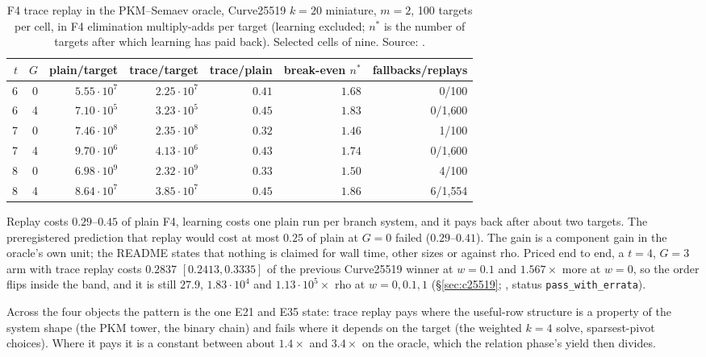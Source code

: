 \begin{table}[t]
\centering\small
\begin{tabular}{@{}rrrrrrr@{}}
\toprule
$t$ & $G$ & plain/target & trace/target & trace/plain & break-even $n^*$ & fallbacks/replays \\
\midrule
6 & 0 & $5.55\cdot10^7$ & $2.25\cdot10^7$ & $0.41$ & $1.68$ & 0/100 \\
6 & 4 & $7.10\cdot10^5$ & $3.23\cdot10^5$ & $0.45$ & $1.83$ & 0/1{,}600 \\
7 & 0 & $7.46\cdot10^8$ & $2.35\cdot10^8$ & $0.32$ & $1.46$ & 1/100 \\
7 & 4 & $9.70\cdot10^6$ & $4.13\cdot10^6$ & $0.43$ & $1.74$ & 0/1{,}600 \\
8 & 0 & $6.98\cdot10^9$ & $2.32\cdot10^9$ & $0.33$ & $1.50$ & 4/100 \\
8 & 4 & $8.64\cdot10^7$ & $3.85\cdot10^7$ & $0.45$ & $1.86$ & 6/1{,}554 \\
\bottomrule
\end{tabular}
\caption[]{F4 trace replay in the PKM--Semaev oracle, Curve25519 $k=20$
miniature, $m=2$, 100 targets per cell, in F4 elimination multiply-adds per
target (learning excluded; $n^*$ is the number of targets after which
learning has paid back). Selected cells of nine. Source:
.}
\label{tab:fe-trace}
\end{table}

\noindent Replay costs $0.29$--$0.45$ of plain F4, learning costs one plain
run per branch system, and it pays back after about two targets. The
preregistered prediction that replay would cost at most $0.25$ of plain at
$G=0$ failed ($0.29$--$0.41$). The gain is a component gain in the oracle's
own unit; the README states that nothing is claimed for wall time, other
sizes or against rho. Priced end to end, a $t=4$, $G=3$ arm with trace
replay costs $0.2837$ $[0.2413,0.3335]$ of the previous Curve25519 winner at
$w=0.1$ and $1.567\times$ more at $w=0$, so the order flips inside the band,
and it is still $27.9$, $1.83\cdot10^4$ and $1.13\cdot10^5\times$ rho at
$w=0,0.1,1$ (\S\ref{sec:c25519};
,
status \texttt{pass\_with\_errata}).

Across the four objects the pattern is the one E21 and E35 state: trace
replay pays where the useful-row structure is a property of the system
shape (the PKM tower, the binary chain) and fails where it depends on the
target (the weighted $k=4$ solve, sparsest-pivot choices). Where it pays it
is a constant between about $1.4\times$ and $3.4\times$ on the oracle, which the
relation phase's yield then divides.
